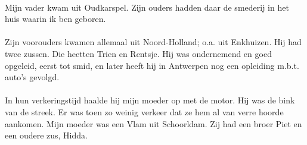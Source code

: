 \paragraph{}
Mijn vader kwam uit Oudkarspel. Zijn ouders hadden daar de smederij in het huis waarin ik ben geboren. 


\paragraph{}
Zijn voorouders kwamen allemaal uit Noord-Holland; o.a. uit Enkhuizen. 
Hij had twee zussen. Die heetten Trien en Rentsje.
Hij was ondernemend en goed opgeleid, eerst tot smid, en later heeft hij in Antwerpen nog een opleiding m.b.t. auto’s gevolgd.

\paragraph{}

In hun verkeringstijd haalde hij mijn moeder op met de motor. Hij was de bink van de streek. Er was toen zo weinig verkeer dat ze hem al van verre hoorde aankomen. Mijn moeder was een Vlam uit Schoorldam. Zij had een broer Piet en een oudere zus, Hidda. 